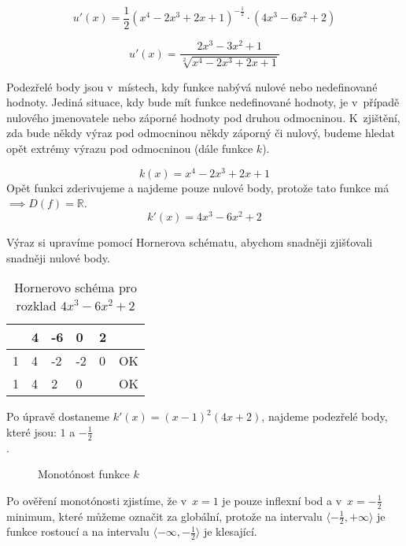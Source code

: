 \begin{displaymath}
u'(x)=\frac{1}{2}(x^4 -2x^3 + 2x + 1)^{-\frac{1}{2}}\cdot(4x^3 - 6x^2 + 2)
\end{displaymath}

\begin{displaymath}
u'(x)=\frac{2x^3 - 3x^2 + 1}{\sqrt[2]{x^4 -2x^3 + 2x + 1}}
\end{displaymath}

Podezřelé body jsou v~místech, kdy funkce nabývá nulové nebo nedefinované hodnoty. 
Jediná situace, kdy bude mít funkce nedefinované hodnoty, je v~případě nulového jmenovatele nebo záporné hodnoty pod druhou odmocninou.
K~zjištění, zda bude někdy výraz pod odmocninou někdy záporný či nulový, budeme hledat opět extrémy výrazu pod odmocninou (dále funkce \(k\)).

\begin{displaymath}
k(x)=x^4 -2x^3 + 2x + 1
\end{displaymath}
Opět funkci zderivujeme a najdeme pouze nulové body, protože tato funkce má \(\implies D(f) = \mathbb{R}\).
\begin{displaymath}
k'(x)=4x^3 -6x^2 + 2
\end{displaymath}

Výraz si upravíme pomocí Hornerova schématu, abychom snadněji zjišťovali snadněji nulové body.
\begin{table}[!h]
\centering
\begin{tabular}{l||l|l|l|l|l}
	 & 4 & -6 &  0 & 2 &    \\ \hline\hline
   1 & 4 & -2 & -2 & 0 & OK \\ \hline
   1 & 4 &  2 &  0 &   & OK \\
\end{tabular}
\caption{Hornerovo schéma pro rozklad $4x^3 - 6x^2 + 2$}
\end{table}

Po úpravě dostaneme \(k'(x)=(x-1)^2(4x + 2)\), najdeme podezřelé body, které jsou: $1$ a $-\frac{1}{2}$\\.

\begin{figure}[H]
	\centering
	
	\caption{Monotónost funkce \(k\)}
\end{figure}

Po ověření monotónosti zjistíme, že v~$x=1$ je pouze inflexní bod a v~$x=-\frac{1}{2}$ minimum, 
které můžeme označit za globální, protože na intervalu \(\langle-\frac{1}{2},+\infty\rangle\) je funkce rostoucí 
a na intervalu \(\langle-\infty,-\frac{1}{2}\rangle\) je klesající.

